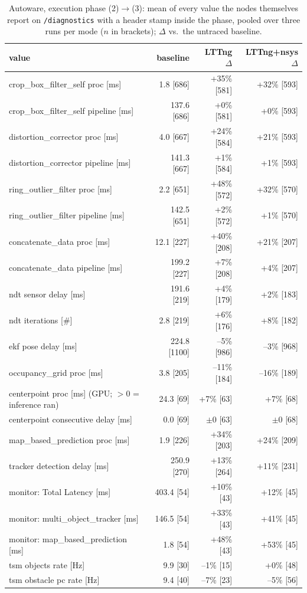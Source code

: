 \begin{table}[t]\centering\scriptsize
\caption{Autoware, execution phase (2)$\rightarrow$(3): mean of every value the nodes themselves report on \texttt{/diagnostics} with a header stamp inside the phase, pooled over three runs per mode ($n$ in brackets); $\Delta$ vs.\ the untraced baseline.}
\label{tab:aw-phase-execution}
\begin{tabular}{lrrr}
\toprule
value & baseline & LTTng $\Delta$ & LTTng+nsys $\Delta$ \\
\midrule
crop\_box\_filter\_self proc [ms] & 1.8 [686] & +35\% [581] & +32\% [593] \\
crop\_box\_filter\_self pipeline [ms] & 137.6 [686] & +0\% [581] & +0\% [593] \\
distortion\_corrector proc [ms] & 4.0 [667] & +24\% [584] & +21\% [593] \\
distortion\_corrector pipeline [ms] & 141.3 [667] & +1\% [584] & +1\% [593] \\
ring\_outlier\_filter proc [ms] & 2.2 [651] & +48\% [572] & +32\% [570] \\
ring\_outlier\_filter pipeline [ms] & 142.5 [651] & +2\% [572] & +1\% [570] \\
concatenate\_data proc [ms] & 12.1 [227] & +40\% [208] & +21\% [207] \\
concatenate\_data pipeline [ms] & 199.2 [227] & +7\% [208] & +4\% [207] \\
ndt sensor delay [ms] & 191.6 [219] & +4\% [179] & +2\% [183] \\
ndt iterations [\#] & 2.8 [219] & +6\% [176] & +8\% [182] \\
ekf pose delay [ms] & 224.8 [1100] & --5\% [986] & --3\% [968] \\
occupancy\_grid proc [ms] & 3.8 [205] & --11\% [184] & --16\% [189] \\
centerpoint proc [ms] (GPU; $>$0 = inference ran) & 24.3 [69] & +7\% [63] & +7\% [68] \\
centerpoint consecutive delay [ms] & 0.0 [69] & $\pm$0 [63] & $\pm$0 [68] \\
map\_based\_prediction proc [ms] & 1.9 [226] & +34\% [203] & +24\% [209] \\
tracker detection delay [ms] & 250.9 [270] & +13\% [264] & +11\% [231] \\
monitor: Total Latency [ms] & 403.4 [54] & +10\% [43] & +12\% [45] \\
monitor: multi\_object\_tracker [ms] & 146.5 [54] & +33\% [43] & +41\% [45] \\
monitor: map\_based\_prediction [ms] & 1.8 [54] & +48\% [43] & +53\% [45] \\
tsm objects rate [Hz] & 9.9 [30] & --1\% [15] & +0\% [48] \\
tsm obstacle pc rate [Hz] & 9.4 [40] & --7\% [23] & --5\% [56] \\
\bottomrule
\end{tabular}
\end{table}
